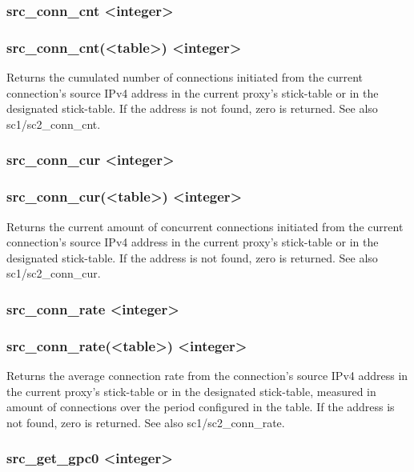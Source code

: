 \subsubsection[src\_conn\_cnt]{src\_conn\_cnt <integer>}
\subsubsection*{src\_conn\_cnt(<table>) <integer>}
  Returns the cumulated number of connections initiated from the current
  connection's source IPv4 address in the current proxy's stick-table or in
  the designated stick-table. If the address is not found, zero is returned.
  See also sc1/sc2\_conn\_cnt.

\subsubsection[src\_conn\_cur]{src\_conn\_cur <integer>}
\subsubsection*{src\_conn\_cur(<table>) <integer>}


  Returns the current amount of concurrent connections initiated from the
  current connection's source IPv4 address in the current proxy's stick-table
  or in the designated stick-table. If the address is not found, zero is
  returned. See also sc1/sc2\_conn\_cur.

\subsubsection[src\_conn\_rate]{src\_conn\_rate <integer>}
\subsubsection*{src\_conn\_rate(<table>) <integer>}
  Returns the average connection rate from the connection's source IPv4 address
  in the current proxy's stick-table or in the designated stick-table, measured
  in amount of connections over the period configured in the table. If the
  address is not found, zero is returned. See also sc1/sc2\_conn\_rate.

\subsubsection[src\_get\_gpc0]{src\_get\_gpc0 <integer>}
